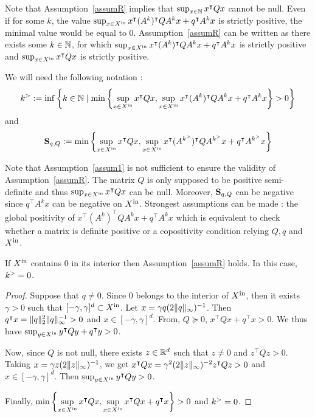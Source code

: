\documentclass[10pt]{article}
\begin{document}
Note that Assumption~\ref{assumR} implies that $\sup_{x\in\mathbb{N}} x^\intercal Q x$ cannot be null. Even if for some $k$, the value
$\sup_{x\in X^\mathrm{in}} x^\intercal (A^k)^\intercal Q A^k x+q^\intercal A^k x$ is strictly positive, the minimal value would be equal to 0. 
Assumption~\ref{assumR} can be written as there exists  some $k\in\mathbb{N}$, for which $\sup_{x\in X^\mathrm{in}} x^\intercal (A^k)^\intercal Q A^k x+q^\intercal A^k x$ is strictly positive and $\sup_{x\in X^\mathrm{in}} x^\intercal Q x$ is strictly positive.
 
We will need the following notation :
\[
k^{>}:=\inf\left\{k\in\mathbb{N}\mid \min\left\{\sup_{x\in X^\mathrm{in}} x^\intercal Q x , \sup_{x\in X^\mathrm{in}} x^\intercal (A^k)^\intercal Q A^k x+q^\intercal A^k x\right\}>0\right\}
\]
and
\[
\mathbf{S}_{q,Q}:= \min\left\{\sup_{x\in X^\mathrm{in}} x^\intercal Q x , \sup_{x\in X^\mathrm{in}} x^\intercal (A^{k^{>}})^\intercal Q A^{k^{>}} x+q^\intercal A^{k^{>}}x\right\}
\]

Note that Assumption~\ref{assum1} is not sufficient to ensure the validity of Assumption~\ref{assumR}. The matrix $Q$ is only supposed to be positive semi-definite and thus $\sup_{x\in X^\mathrm{in}} x^\intercal Q x$ can be null. Moreover, $\mathbf{S}_{q,Q}$ can be negative since $q^\intercal A^k x$ can be negative on $X^\mathrm{in}$. Strongest assumptions can be made : the global positivity of $x^\intercal (A^k)^\intercal  Q A^k x+q^\intercal A^k x$ which is equivalent to check whether a matrix is definite positive or a copositivity condition relying $Q,q$ and $X^\mathrm{in}$. 

\begin{prop}
\label{interiorprop}
If $X^\mathrm{in}$ contains $0$ in its interior then Assumption~\ref{assumR} holds. In this case, $k^{>}=0$.
\end{prop}

\begin{proof}
Suppose that $q\neq 0$. Since 0 belongs to the interior of $X^\mathrm{in}$, then it exists $\gamma>0$ such that $[-\gamma,\gamma]^d\subset X^\mathrm{in}$. Let $x=\gamma q (2\| q\|_{\infty})^{-1}$. Then $q^\intercal x=\| q\|_2^2\| q\|_{\infty}^{-1} >0$ and $x\in [-\gamma,\gamma]^d$. From, $Q\succeq 0$, $x^\intercal Q x+q^\intercal x>0$. We thus have $\sup_{y\in X^\mathrm{in}}  y^\intercal Q y+q^\intercal y>0$. 

Now, since $Q$ is not null, there exists $z\in\mathbb R^d$ such that $z\neq 0$ and $z^\intercal Q z>0$. Taking $x=\gamma z (2\| z\|_\infty)^{-1}$, we get $x^\intercal Q x=\gamma ^2 (2\| z\|_\infty)^{-2} z^\intercal Q z>0$ and $x\in[-\gamma,\gamma]^d$. Then $\sup_{y\in X^\mathrm{in}} y^\intercal Q y>0$. 

Finally, $\displaystyle{\min\left\{\sup_{x\in X^\mathrm{in}} x^\intercal Q x , \sup_{x\in X^\mathrm{in}} x^\intercal Q x+q^\intercal x\right\}>0}$ and $k^{>}=0$.
\end{proof}
\end{document}
